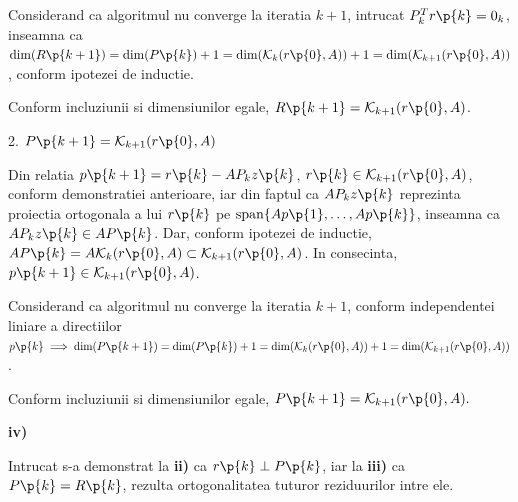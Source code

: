 \begin{demonstratie}
    Considerand ca algoritmul nu converge la iteratia $ k + 1 $, intrucat $ P_k^T r\p{k} = 0_k $, inseamna ca $ \text{dim}(R\p{k + 1}) = \text{dim}(P\p{k}) + 1 =  \text{dim}(\mathcal{K}_{k}(r\p{0}, A)) + 1 = \text{dim}(\mathcal{K}_{k + 1}(r\p{0}, A))$, conform ipotezei de inductie. 

    \medskip

    Conform incluziunii si dimensiunilor egale, $ R\p{k + 1} = \mathcal{K}_{k + 1}(r\p{0}, A) $.

    \bigskip

    2. $ P\p{k + 1} = \mathcal{K}_{k + 1}(r\p{0}, A) $

    \medskip

    Din relatia $ p\p{k + 1} = r\p{k} - A P_k z\p{k} $, $ r\p{k} \in \mathcal{K}_{k + 1}(r\p{0}, A) $, conform demonstratiei anterioare, iar din faptul ca $ A P_k z\p{k} $ reprezinta proiectia ortogonala a lui $ r\p{k} $ pe $\text{span}\{A p\p{1}, \dots, A p\p{k}\}$, inseamna ca $ A P_k z\p{k} \in A P\p{k} $. Dar, conform ipotezei de inductie, $ A P\p{k} = A \mathcal{K}_{k}(r\p{0}, A) \subset \mathcal{K}_{k + 1}(r\p{0}, A) $. In consecinta, $ p\p{k + 1} \in \mathcal{K}_{k + 1}(r\p{0}, A) $.

    \medskip

    Considerand ca algoritmul nu converge la iteratia $ k + 1 $, conform independentei liniare a directiilor $ p\p{k} \implies \text{dim}(P\p{k + 1}) = \text{dim}(P\p{k}) + 1 =  \text{dim}(\mathcal{K}_{k}(r\p{0}, A)) + 1 = \text{dim}(\mathcal{K}_{k + 1}(r\p{0}, A)) $.

    \medskip

    Conform incluziunii si dimensiunilor egale, $ P\p{k + 1} = \mathcal{K}_{k + 1}(r\p{0}, A). $

    \bigskip

    \noindent \textbf{iv)}

    \medskip

    Intrucat s-a demonstrat la \textbf{ii)} ca $r\p{k} \perp P\p{k}$, iar la \textbf{iii)} ca $ P\p{k} = R\p{k} $, rezulta ortogonalitatea tuturor reziduurilor intre ele.

\end{demonstratie}